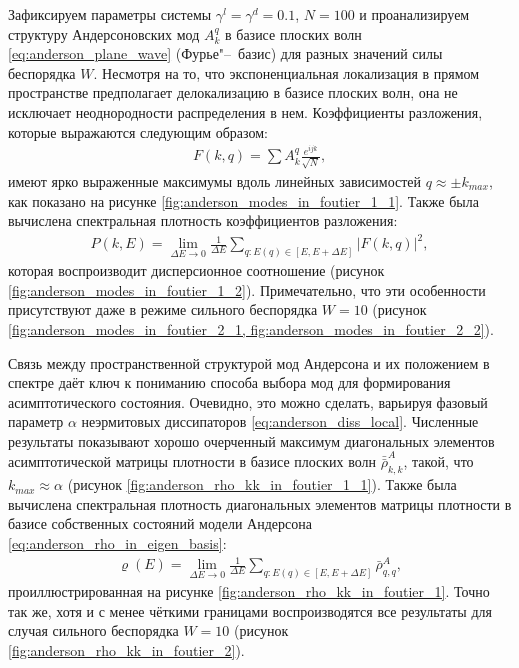 Зафиксируем параметры системы \(\gamma^l = \gamma^d = 0.1\), \(N=100\) и проанализируем структуру Андерсоновских мод \(A^{q}_k\) в базисе плоских волн \cref{eq:anderson_plane_wave} (Фурье"--~базис) для разных значений силы беспорядка \(W\).
Несмотря на то, что экспоненциальная локализация в прямом пространстве предполагает делокализацию в базисе плоских волн, она не исключает неоднородности распределения в нем.
Коэффициенты разложения, которые выражаются следующим образом:
\begin{equation}
	\label{eq:anderson_modes_in_plane_wave}
	\begin{gathered}
		F(k,q) = \sum A^q_k \frac{e^{i j k}}{\sqrt{N}},
	\end{gathered}
\end{equation}
имеют ярко выраженные максимумы вдоль линейных зависимостей \(q \approx \pm k_{max}\), как показано на рисунке \cref{fig:anderson_modes_in_foutier_1_1}.
Также была вычислена спектральная плотность коэффициентов разложения:
\begin{equation}
	\label{eq:anderson_modes_in_plane_wave_density}
	\begin{gathered}
		P(k,E) = \lim_{\Delta E \to 0} \frac{1}{\Delta E} \sum_{q:E(q) \in [E, E + \Delta E]} \left| F(k,q) \right|^2 ,
	\end{gathered}
\end{equation}
которая воспроизводит дисперсионное соотношение (рисунок \cref{fig:anderson_modes_in_foutier_1_2}).
Примечательно, что эти особенности присутствуют даже в режиме сильного беспорядка \(W=10\) (рисунок \cref{fig:anderson_modes_in_foutier_2_1, fig:anderson_modes_in_foutier_2_2}).

Связь между пространственной структурой мод Андерсона и их положением в спектре даёт ключ к пониманию способа выбора мод для формирования асимптотического состояния. Очевидно, это можно сделать, варьируя фазовый параметр \(\alpha\) неэрмитовых диссипаторов \cref{eq:anderson_diss_local}.
Численные результаты показывают хорошо очерченный максимум диагональных элементов асимптотической матрицы плотности в базисе плоских волн \(\bar{\bar{\rho}}^A_{k,k}\), такой, что \(k_{max} \approx \alpha\) (рисунок \cref{fig:anderson_rho_kk_in_foutier_1_1}). Также была вычислена спектральная плотность диагональных элементов матрицы плотности в базисе собственных состояний модели Андерсона \cref{eq:anderson_rho_in_eigen_basis}:
\begin{equation}
	\label{eq:anderson_rho_kk_density}
	\begin{gathered}
		\varrho(E) = \lim_{\Delta E \to 0} \frac{1}{\Delta E} \sum_{q:E(q) \in [E, E + \Delta E]} \bar{\rho}^A_{q,q},
	\end{gathered}
\end{equation}
проиллюстрированная на рисунке \cref{fig:anderson_rho_kk_in_foutier_1}. Точно так же, хотя и с менее чёткими границами воспроизводятся все результаты для случая сильного беспорядка \(W=10\) (рисунок \cref{fig:anderson_rho_kk_in_foutier_2}).

